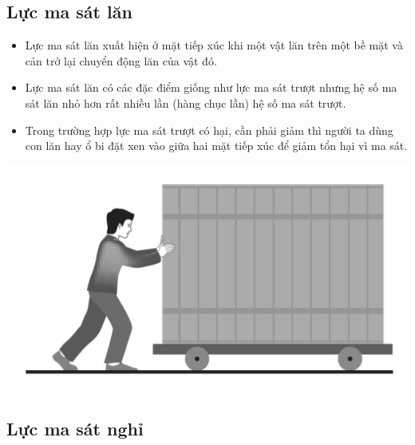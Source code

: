 \subsection{Lực ma sát lăn}
\begin{itemize}
	\item Lực ma sát lăn xuất hiện ở mặt tiếp xúc khi một vật lăn trên một bề mặt và cản trở lại chuyển động lăn của vật đó.
	\item Lực ma sát lăn có các đặc điểm giống như lực ma sát trượt nhưng hệ số ma sát lăn nhỏ hơn rất nhiều lần (hàng chục lần) hệ số ma sát trượt.
	\item Trong trường hợp lực ma sát trượt có hại, cần phải giảm thì người ta dùng con lăn hay ổ bi đặt xen vào giữa hai mặt tiếp xúc để giảm tổn hại vì ma sát.
\end{itemize}
\begin{center}
	\includegraphics[scale=0.35]{../figs/VN10-PH-15-L-012-1-V2-02.JPG}
\end{center}
\subsection{Lực ma sát nghỉ}
